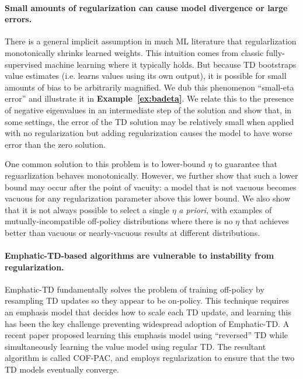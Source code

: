 \paragraph{Small amounts of regularization can cause model divergence or large errors. }
There is a general implicit assumption in much ML literature that regularlization monotonically shrinks learned weights. This intuition comes from classic fully-supervised machine learning where it typically holds. But because TD bootstraps value estimates (i.e. learns values using its own output), it is possible for small amounts of bias to be arbitrarily magnified. We dub this phenomenon ``small-eta error'' and illustrate it in \textbf{Example~\ref{ex:badeta}}. We relate this to the presence of negative eigenvalues in an intermediate step of the solution and %
show that, in some settings, the error of the TD solution may be relatively small when applied with no regularization but adding regularization causes the model to have worse error than the zero solution.

One common solution to this problem is to lower-bound $\eta$ to guarantee that reguarlization behaves monotonically. However, we further show that such a lower bound may occur after the point of vacuity: a model that is not vacuous becomes vacuous for any regularization parameter above this lower bound. We also show that it is not always possible to select a single $\eta$ \emph{a priori}, with examples of mutually-incompatible off-policy distributions where there is no $\eta$ that achieves better than vacuous or nearly-vacuous results at different distributions.


\paragraph{Emphatic-TD-based algorithms are vulnerable to instability from regularization.  }
Emphatic-TD \cite{sutton2016emphatic} fundamentally solves the problem of training off-policy by resampling TD updates so they appear to be on-policy. This technique requires an emphasis model that decides how to scale each TD update, and learning this has been the key challenge preventing widespread adoption of Emphatic-TD. A recent paper \cite{zhang2020provably} proposed learning this emphasis model using ``reversed'' TD while simultaneously learning the value model using regular TD. The resultant algorithm is called COF-PAC, and employs regularization to ensure that the two TD models eventually converge.

